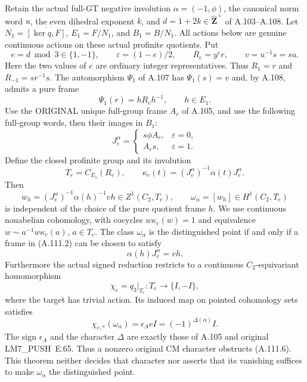 Retain the actual full-GT negative involution \(\alpha=(-1,\phi)\),
the canonical norm word \(u\), the even dihedral exponent \(k\),
and \(d=1+2k\in\widehat{\mathbf Z}^{\times}\) of A.103--A.108.
Let \(N_1=\overline{[\ker q,F]}\), \(E_1=F/N_1\), and
\(B_1=B/N_1\). All actions below are genuine continuous actions
on these actual profinite quotients. Put
\[
 e=d\bmod3\in\{1,-1\},\qquad
 \varepsilon=(1-e)/2,\qquad
 R_e=y^{\varepsilon}r,\qquad v=u^{-1}s=su.
\tag{A.111.1}
\]
Here the two values of \(e\) are ordinary integer representatives.
Thus \(R_1=r\) and \(R_{-1}=sr^{-1}s\).
The automorphism \(\Psi_1\) of A.107 has
\(\Psi_1(s)=v\) and, by A.108, admits a pure frame
\[
 \Psi_1(r)=hR_eh^{-1},\qquad h\in E_1.
\tag{A.111.2}
\]
Use the ORIGINAL unique full-group frame \(A_r\) of A.105, and
use the following full-group words, then their images in \(B_1\):
\[
 J_e^{\alpha}=
 \begin{cases}s\phi A_r,&\varepsilon=0,\\
 A_rs,&\varepsilon=1.
 \end{cases}
\tag{A.111.3}
\]
Define the closed profinite group and its involution
\[
 T_e=C_{E_1}(R_e),\qquad
 \kappa_e(t)=(J_e^{\alpha})^{-1}\alpha(t)J_e^{\alpha}.
\tag{A.111.4}
\]
Then
\[
 w_h=(J_e^{\alpha})^{-1}\alpha(h)^{-1}vh
       \in Z^1(C_2,T_e),\qquad
 \omega_{\alpha}=[w_h]\in H^1(C_2,T_e)
\tag{A.111.5}
\]
is independent of the choice of the pure quotient frame \(h\).
We use continuous nonabelian cohomology, with cocycles
\(w\kappa_e(w)=1\) and equivalence
\(w\sim a^{-1}w\kappa_e(a)\), \(a\in T_e\).
The class \(\omega_{\alpha}\) is the distinguished point if and
only if a frame in (A.111.2) can be chosen to satisfy
\[
                  \alpha(h)J_e^{\alpha}=vh.
\tag{A.111.6}
\]
Furthermore the actual signed reduction restricts to a continuous
\(C_2\)-equivariant homomorphism
\[
 \chi_e=q_3|_{T_e}:T_e\longrightarrow\{I,-I\},
\tag{A.111.7}
\]
where the target has trivial action. Its induced map on pointed
cohomology sets satisfies
\[
 \boxed{\quad
 \chi_{e,*}(\omega_{\alpha})
       =\epsilon_A eI=(-1)^{\Delta(\alpha)}I.
 \quad}
\tag{A.111.8}
\]
The sign \(\epsilon_A\) and the character \(\Delta\) are exactly
those of A.105 and original LM7\_PUSH~E.65. Thus a nonzero original
CM character obstructs (A.111.6). This theorem neither decides
that character nor asserts that its vanishing suffices to make
\(\omega_{\alpha}\) the distinguished point.

